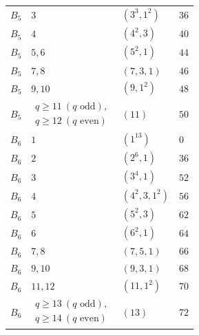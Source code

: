 \documentclass[11pt,a4paper]{amsart}
\numberwithin{equation}{section}
\theoremstyle{definition}
\theoremstyle{remark}
\begin{document}
{\begin{longtable}{@{}p{}p{}p{}p{}@{}}
$B_{5}$&$3$&$(3^{3},1^{2})$&$36$\\
$B_{5}$&$4$&$(4^{2},3)$&$40$\\
$B_{5}$&$5,6$&$(5^{2},1)$&$44$\\
$B_{5}$&$7,8$&$(7,3,1)$&$46$\\
$B_{5}$&$9,10$&$(9,1^{2})$&$48$\\
$B_{5}$&$\begin{gathered}q\ge 11\ (q\text{ odd}),\\q\ge 12\ (q\text{ even})\end{gathered}$&$(11)$&$50$\\ \midrule
$B_{6}$&$1$&$(1^{13})$&$0$\\
$B_{6}$&$2$&$(2^{6},1)$&$36$\\
$B_{6}$&$3$&$(3^{4},1)$&$52$\\
$B_{6}$&$4$&$(4^{2},3,1^{2})$&$56$\\
$B_{6}$&$5$&$(5^{2},3)$&$62$\\
$B_{6}$&$6$&$(6^{2},1)$&$64$\\
$B_{6}$&$7,8$&$(7,5,1)$&$66$\\
$B_{6}$&$9,10$&$(9,3,1)$&$68$\\
$B_{6}$&$11,12$&$(11,1^{2})$&$70$\\
$B_{6}$&$\begin{gathered}q\ge 13\ (q\text{ odd}),\\q\ge 14\ (q\text{ even})\end{gathered}$&$(13)$&$72$\\
\end{longtable}
}
\end{document}
